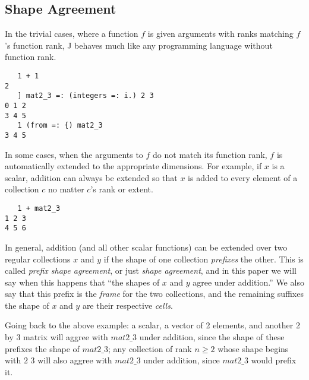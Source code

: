 \subsection{Shape Agreement}
In the trivial cases, where a function $f$ is given arguments with ranks matching $f$'s function rank, 
J behaves much like any programming language without function rank. %
\begin{singlespace}
\begin{verbatim}
   1 + 1
2
   ] mat2_3 =: (integers =: i.) 2 3
0 1 2
3 4 5
   1 (from =: {) mat2_3
3 4 5
\end{verbatim}
\end{singlespace}

In some cases, when the arguments to $f$  do not match its function rank, $f$  is automatically extended to the appropriate dimensions.
For example, if $x$ is a scalar, addition can always be extended so that $x$ is added to every element of a collection $c$ 
no matter $c$'s rank or extent. 
\begin{verbatim}
   1 + mat2_3
1 2 3
4 5 6
\end{verbatim}

In general, addition (and all other scalar functions) can be extended over two regular collections $x$ and $y$ 
if the shape of one collection \textit{prefixes} the other.
This is called \textit{prefix shape agreement}, or just \textit{shape agreement},\cite{rankanduni} 
and in this paper we will say when this happens that ``the shapes of $x$ and $y$ agree under addition.''
We also say that this prefix is the \textit{frame} for the two collections,
and the remaining suffixes the shape of $x$ and $y$ are their respective \textit{cells}.

Going back to the above example: a scalar, a vector of 2 elements, and another 2 by 3 matrix will aggree with $mat2\_3$ under addition, since the shape of these prefixes the shape of $mat2\_3$; 
any collection of rank $n \ge 2$ whose shape begins with $2$ $3$ will also aggree with $mat2\_3$ under addition, since $mat2\_3$ would prefix it.

